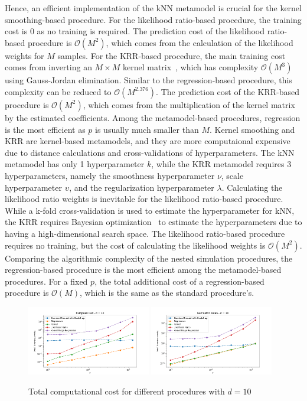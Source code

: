 Hence, an efficient implementation of the kNN metamodel is crucial for the kernel smoothing-based procedure.
For the likelihood ratio-based procedure, the training cost is $0$ as no training is required.
The prediction cost of the likelihood ratio-based procedure is $\mathcal{O}(M^2)$, which comes from the calculation of the likelihood weights for $M$ samples.
For the KRR-based procedure, the main training cost comes from inverting an $M \times M$ kernel matrix~\citep{scholkopf2002learning}, which has complexity $\mathcal{O}(M^3)$ using Gauss-Jordan elimination.
Similar to the regression-based procedure, this complexity can be reduced to $\mathcal{O}(M^{2.376})$.
The prediction cost of the KRR-based procedure is $\mathcal{O}(M^2)$, which comes from the multiplication of the kernel matrix by the estimated coefficients.
Among the metamodel-based procedures, regression is the most efficient as $p$ is usually much smaller than $M$. 
Kernel smoothing and KRR are kernel-based metamodels, and they are more computaional expensive due to distance calculations and cross-validations of hyperparameters. 
The kNN metamodel has only 1 hyperparameter $k$, while the KRR metamodel requires 3 hyperparameters, namely the smoothness hyperparameter $\nu$, scale hyperparameter $\upsilon$, and the regularization hyperparameter $\lambda$.
Calculating the likelihood ratio weights is inevitable for the likelihood ratio-based procedure. 
While a k-fold cross-validation is used to estimate the hyperparameter for kNN, the KRR requires Bayesian optimization~\citep{shahriari2015taking} to estimate the hyperparameters due to having a high-dimensional search space.
The likelihood ratio-based procedure requires no training, but the cost of calculating the likelihood weights is $\mathcal{O}(M^2)$.
Comparing the algorithmic complexity of the nested simulation procedures, the regression-based procedure is the most efficient among the metamodel-based procedures.
For a fixed $p$, the total additional cost of a regression-based procedure is $\mathcal{O}(M)$, which is the same as the standard procedure's.


\begin{figure}[ht!]
    \centering
    \includegraphics[width=0.48\textwidth]{./project1/figures/figure11a.png}
    \includegraphics[width=0.48\textwidth]{./project1/figures/figure11b.png}
    \caption{Total computational cost for different procedures with $d=10$}
    \label{fig1:tcc}
\end{figure}


